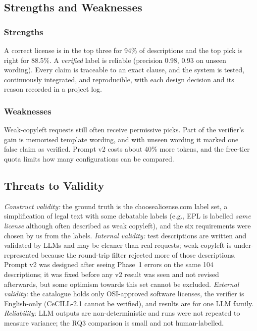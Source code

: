 \subsection{Strengths and Weaknesses}

\subsubsection{Strengths}
A correct license is in the top three for 94\% of descriptions and the top pick is right for 88.5\%. A \emph{verified} label is reliable (precision 0.98, 0.93 on unseen wording). Every claim is traceable to an exact clause, and the system is tested, continuously integrated, and reproducible, with each design decision and its reason recorded in a project log.

\subsubsection{Weaknesses}
Weak-copyleft requests still often receive permissive picks. Part of the verifier's gain is memorised template wording, and with unseen wording it marked one false claim as verified. Prompt v2 costs about 40\% more tokens, and the free-tier quota limits how many configurations can be compared.

\subsection{Threats to Validity}
\emph{Construct validity:} the ground truth is the choosealicense.com label set, a simplification of legal text with some debatable labels (e.g., EPL is labelled \emph{same license} although often described as weak copyleft), and the six requirements were chosen by us from the labels. \emph{Internal validity:} test descriptions are written and validated by LLMs and may be cleaner than real requests; weak copyleft is under-represented because the round-trip filter rejected more of those descriptions. Prompt v2 was designed after seeing Phase~1 errors on the same 104 descriptions; it was fixed before any v2 result was seen and not revised afterwards, but some optimism towards this set cannot be excluded. \emph{External validity:} the catalogue holds only OSI-approved software licenses, the verifier is English-only (CeCILL-2.1 cannot be verified), and results are for one LLM family. \emph{Reliability:} LLM outputs are non-deterministic and runs were not repeated to measure variance; the RQ3 comparison is small and not human-labelled.
